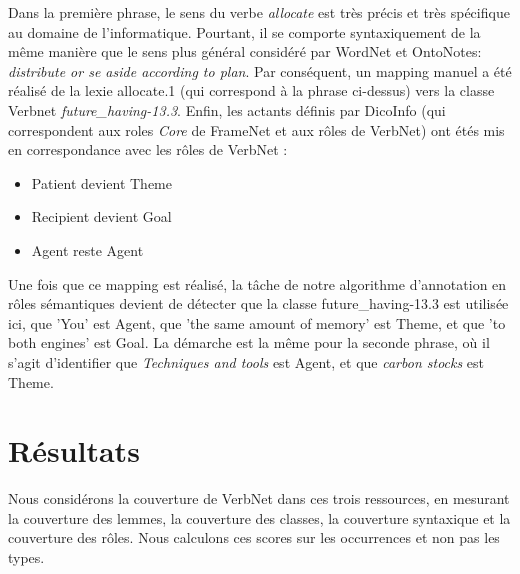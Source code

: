 Dans la première phrase, le sens du verbe \textit{allocate} est très précis et
très spécifique au domaine de l'informatique. Pourtant, il se comporte
syntaxiquement de la même manière que le sens plus général considéré par
WordNet et OntoNotes: \textit{distribute or se aside according to plan}. Par
conséquent, un mapping manuel a été réalisé de la lexie allocate.1 (qui
correspond à la phrase ci-dessus) vers la classe Verbnet
\textit{future\_having-13.3}. Enfin, les actants définis par DicoInfo (qui
correspondent aux roles \textit{Core} de FrameNet et aux rôles de VerbNet) ont
étés mis en correspondance avec les rôles de VerbNet :

\begin{itemize}
    \item Patient devient Theme
    \item Recipient devient Goal
    \item Agent reste Agent
\end{itemize}

Une fois que ce mapping est réalisé, la tâche de notre algorithme d'annotation
en rôles sémantiques devient de détecter que la classe future\_having-13.3 est
utilisée ici, que 'You' est Agent, que 'the same amount of memory' est Theme,
et que 'to both engines' est Goal. La démarche est la même pour la seconde
phrase, où il s'agit d'identifier que \textit{Techniques and tools} est Agent,
et que \textit{carbon stocks} est Theme.


\section{Résultats}
\label{sec:domainsrlresults}

Nous considérons la couverture de VerbNet dans ces trois ressources, en
mesurant la couverture des lemmes, la couverture des classes, la couverture
syntaxique et la couverture des rôles. Nous calculons ces scores sur les
occurrences et non pas les types.

